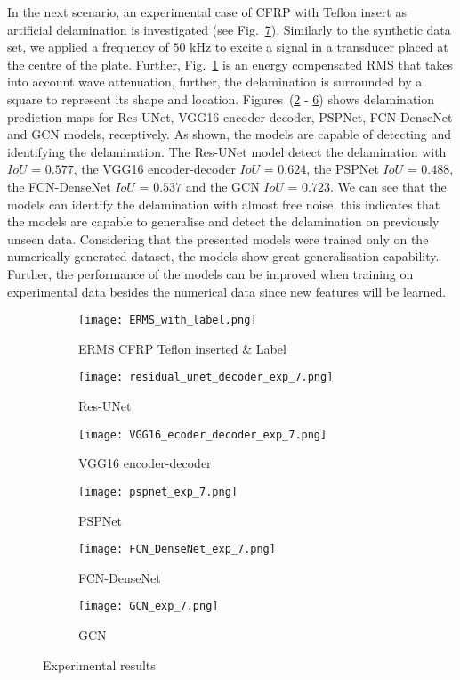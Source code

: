 In the next scenario, an experimental case of CFRP with Teflon insert as artificial delamination is investigated (see Fig.~\ref{fig:Exp_ERMS_teflon}).  
Similarly to the synthetic data set, we applied a frequency of \(50\) kHz to excite a signal in a transducer placed at the centre of the plate. 
Further, Fig.~\ref{fig:Delamination} is an energy compensated RMS that takes into account wave attenuation, further, the delamination is surrounded by a square to represent its shape and location. 
Figures~(\ref{fig:unet_exp_7_} - \ref{fig:gcn_exp}) shows delamination prediction maps for Res-UNet, VGG16 encoder-decoder, PSPNet, FCN-DenseNet and GCN models, receptively.
As shown, the models are capable of detecting and identifying the delamination. 
The Res-UNet model detect the delamination with \(IoU\) = \(0.577\), the VGG16 encoder-decoder \(IoU\)  = \(0.624\), the PSPNet \(IoU\) = \(0.488\), the FCN-DenseNet \(IoU\) = \(0.537\) and the GCN \(IoU\) = \(0.723\).
We can see that the models can identify the delamination with almost free noise, this indicates that the models are capable to generalise and detect the delamination on previously unseen data. 
Considering that the presented models were trained only on the numerically generated dataset, the models show great generalisation capability.
Further, the performance of the models can be improved when training on experimental data besides the numerical data since new features will be learned. 
\begin{figure} [!h]
	\centering
	\begin{subfigure}[b]{0.47\textwidth}
		\centering
		\texttt{[image: ERMS\_with\_label.png]}
		\caption{ERMS CFRP Teflon inserted \& Label}
		\label{fig:Delamination}	
	\end{subfigure}	
	\hfill
	\begin{subfigure}[b]{0.47\textwidth}
		\centering
		\texttt{[image: residual\_unet\_decoder\_exp\_7.png]}
		\caption{Res-UNet} 
		\label{fig:unet_exp_7_}
	\end{subfigure}
	\hfill
	\begin{subfigure}[b]{0.47\textwidth}
		\centering
		\texttt{[image: VGG16\_ecoder\_decoder\_exp\_7.png]}
		\caption{VGG16 encoder-decoder} 
		\label{fig:vgg16_exp_7_}
	\end{subfigure}
	\hfill
	\begin{subfigure}[b]{0.47\textwidth}
		\centering
		\texttt{[image: pspnet\_exp\_7.png]}
		\caption{PSPNet} 
		\label{fig:pspnet_exp_7_}
	\end{subfigure}
	\hfill
	\begin{subfigure}[b]{0.47\textwidth}
		\centering
		\texttt{[image: FCN\_DenseNet\_exp\_7.png]}
		\caption{FCN-DenseNet} 
		\label{fig:fcn_densenet_exp}
	\end{subfigure}
	\hfill
	\begin{subfigure}[b]{0.47\textwidth}
		\centering
		\texttt{[image: GCN\_exp\_7.png]}
		\caption{GCN} 
		\label{fig:gcn_exp}
	\end{subfigure}
	\caption{Experimental results}
	\label{fig:Exp_ERMS_teflon}
\end{figure}
